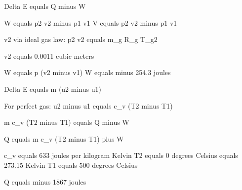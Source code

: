 Delta E equals Q minus W  

W equals p2 v2 minus p1 v1  
V equals p2 v2 minus p1 v1  

v2 via ideal gas law:  
p2 v2 equals m_g R_g T_g2  

v2 equals 0.0011 cubic meters  

W equals p (v2 minus v1)  
W equals minus 254.3 joules  

Delta E equals m (u2 minus u1)  

For perfect gas:  
u2 minus u1 equals c_v (T2 minus T1)  

m c_v (T2 minus T1) equals Q minus W  

Q equals m c_v (T2 minus T1) plus W  

c_v equals 633 joules per kilogram Kelvin  
T2 equals 0 degrees Celsius equals 273.15 Kelvin  
T1 equals 500 degrees Celsius  

Q equals minus 1867 joules